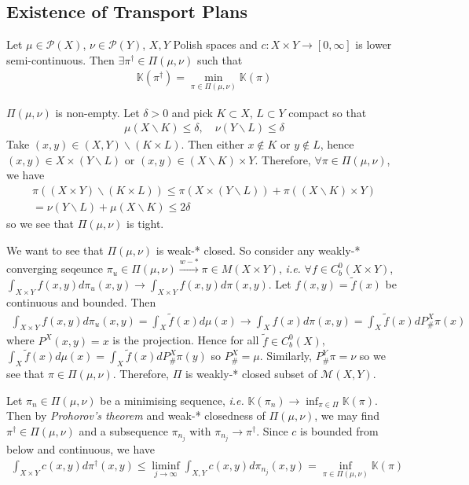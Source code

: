 \documentclass[12pt,a4paper]{article}
\newenvironment{proof}
{\begin{changemargin}{1cm}{0.5cm} 
	}%
	{\end{changemargin}
}
\newenvironment{p}
{\begin{proof} 
	}%
	{\end{proof}
}
\begin{document}
\subsection{Existence of Transport Plans}

  Let $\mu \in \mathscr{P}(X)$, $\nu \in \mathscr{P}(Y)$, $X, Y$ Polish spaces and $c: X\times Y \rightarrow [0, \infty]$ is lower semi-continuous. Then $\exists \pi^{\dagger} \in \Pi(\mu, \nu)$ such that
\begin{align*}
\mathbb{K}(\pi^{\dagger}) = \min_{\pi \in \Pi(\mu, \nu)}\mathbb{K}(\pi)
\end{align*}
\begin{p}
\pf $\Pi(\mu, \nu)$ is non-empty. Let $\delta >0$ and pick $K\subset X$, $L\subset Y$ compact so that
\begin{align*}
\mu(X\backslash K) \leq \delta, \quad \nu(Y \backslash L) \leq \delta
\end{align*}
Take $(x, y) \in (X,Y) \backslash(K \times L)$. Then either $x\not\in K$ or $y\not\in L$, hence $(x,y) \in X\times (Y\backslash L)$ or $(x,y) \in (X\backslash K) \times Y$. Therefore, $\forall \pi \in \Pi(\mu, \nu)$, we have
\begin{align*}
\pi((X\times Y)\backslash (K\times L)) \leq \pi(X\times (Y\backslash L)) + \pi((X\backslash K) \times Y) \\
= \nu(Y\backslash L) + \mu(X\backslash K) \leq 2\delta
\end{align*}
so we see that $\Pi(\mu, \nu)$ is tight.

\quad We want to see that $\Pi(\mu, \nu)$ is weak-* closed. So consider any weakly-* converging seqeunce $\pi_u \in \Pi(\mu, \nu) \xrightarrow{w-*} \pi \in M(X\times Y)$, \textit{i.e.} $\forall f\in C_b^0(X\times Y)$, $\int_{X\times Y} f(x,y) d\pi_u(x,y) \rightarrow \int_{X\times Y} f(x,y) d\pi(x,y)$. Let $f(x,y) = \tilde{f}(x)$ be continuous and bounded. Then
\begin{align*}
\int_{X\times Y} f(x,y) d\pi_u(x,y) = \int_{X} \tilde{f} (x) d\mu(x) \rightarrow \int_X f (x) d\pi(x,y) = \int_{X} \tilde{f}(x) dP_{\#}^X \pi(x)
\end{align*}
where $P^X(x,y) = x$ is the projection. Hence for all $\tilde{f} \in C_b^0 (X)$, $\int_X \tilde{f}(x)d\mu(x) = \int_X \tilde{f}(x) dP_{\#}^X \pi(y)$ so $P_{\#}^X = \mu$. Similarly, $P_{\#}^Y \pi =\nu$ so we see that $\pi \in \Pi(\mu, \nu)$. Therefore, $\Pi$ is weakly-* closed subset of $\mathscr{M}(X,Y)$.

\quad Let $\pi_n \in \Pi(\mu, \nu)$ be a minimising sequence, \textit{i.e.} $\mathbb{K}(\pi_n) \rightarrow \inf_{\pi \in \Pi}\mathbb{K}(\pi)$. Then by \emph{Prohorov's theorem} and weak-* closedness of $\Pi(\mu, \nu)$, we may find $\pi^{\dagger} \in \Pi(\mu, \nu)$ and a subsequence $\pi_{n_j}$ with $\pi_{n_j} \rightarrow \pi^{\dagger}$. Since $c$ is bounded from below and continuous, we have
\begin{align*}
\int_{X\times Y} c(x,y)d\pi^{\dagger}(x,y) \leq \liminf_{j\rightarrow \infty} \int_{X,Y} c(x,y) d\pi_{n_j}(x,y) = \inf_{\pi \in \Pi(\mu, \nu)}\mathbb{K}(\pi)
\end{align*}
\eop
\end{p}
\end{document}
